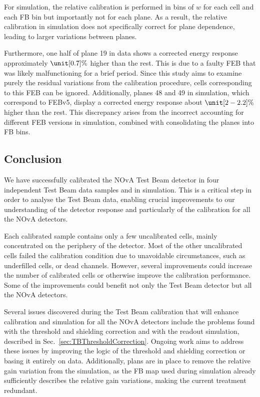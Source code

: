 For simulation, the relative calibration is performed in bins of $w$ for each cell and each \gls{FB} bin but importantly not for each plane. As a result, the relative calibration in simulation does not specifically correct for plane dependence, leading to larger variations between planes.

Furthermore, one half of plane 19 in data shows a corrected energy response approximately $\unit[0.7]{\%}$ higher than the rest. This is due to a faulty \gls{FEB} that was likely malfunctioning for a brief period. Since this study aims to examine purely the residual variations from the calibration procedure, cells corresponding to this \gls{FEB} can be ignored. Additionally, planes 48 and 49 in simulation, which correspond to \gls{FEB}v5, display a corrected energy response about $\unit[2-2.2]{\%}$ higher than the rest. This discrepancy arises from the incorrect accounting for different \gls{FEB} versions in simulation, combined with consolidating the planes into \gls{FB} bins.

\subsection{Conclusion}

We have successfully calibrated the NOvA Test Beam detector in four independent Test Beam data samples and in simulation. This is a critical step in order to analyse the Test Beam data, enabling crucial improvements to our understanding of the detector response and particularly of the calibration for all the \gls{NOvA} detectors.

Each calibrated sample contains only a few uncalibrated cells, mainly concentrated on the periphery of the detector. Most of the other uncalibrated cells failed the calibration condition due to unavoidable circumstances, such as underfilled cells, or dead channels. However, several improvements could increase the number of calibrated cells or otherwise improve the calibration performance. Some of the improvements could benefit not only the Test Beam detector but all the \gls{NOvA} detectors.

Several issues discovered during the Test Beam calibration that will enhance calibration and simulation for all the \gls{NOvA} detectors include the problems found with the threshold and shielding correction and with the readout simulation, described in Sec.~\ref{sec:TBThresholdCorrection}. Ongoing work aims to address these issues by improving the logic of the threshold and shielding correction or basing it entirely on data. Additionally, plans are in place to remove the relative gain variation from the simulation, as the \gls{FB} map used during simulation already sufficiently describes the relative gain variations, making the current treatment redundant.

